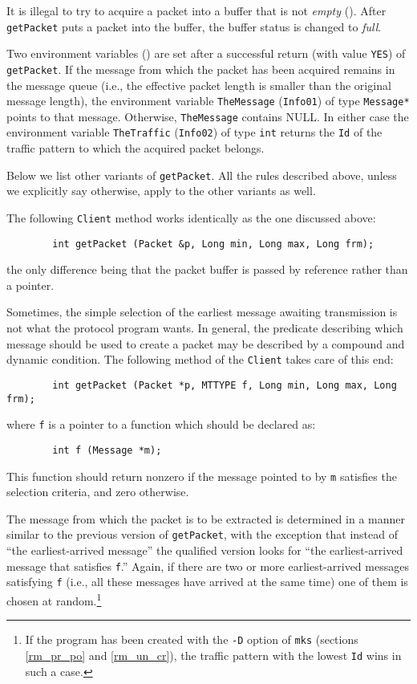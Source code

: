 It is illegal to try to acquire a packet into a buffer that is not
{\em empty\/} ().
After {\tt getPacket} puts a packet into the buffer, the buffer status
is changed to {\em full}.

Two environment variables () are set after a successful
return (with value {\tt YES}) of {\tt getPacket}.
If the message from which the packet has been acquired
remains in the message queue (i.e., the effective packet length is smaller than
the original message length), the environment variable
{\tt TheMessage} ({\tt Info01}) of type {\tt Message*} points to that message.
Otherwise, {\tt TheMessage} contains NULL.
In either case the environment variable
{\tt TheTraffic} ({\tt Info02}) of type {\tt int} returns the
{\tt Id} of the traffic pattern to which the acquired packet belongs.

Below we list other variants of {\tt getPacket}.
All the rules described above, unless we explicitly say otherwise,
apply to the other variants as well.

The following {\tt Client} method works identically as the one discussed
above:
\begin{verbatim}
        int getPacket (Packet &p, Long min, Long max, Long frm);
\end{verbatim}
the only difference being that the packet buffer is passed by reference
rather than a pointer.

Sometimes, the simple selection of the earliest message awaiting transmission
is not what the protocol program wants.
In general, the predicate describing which message should be used to create
a packet may be described by a compound and dynamic condition.
The following method of the {\tt Client} takes care of this end:
\begin{verbatim}
        int getPacket (Packet *p, MTTYPE f, Long min, Long max, Long frm);
\end{verbatim}
where {\tt f} is a pointer to a function which should be declared as:
\begin{verbatim}
        int f (Message *m);
\end{verbatim}
This function should return nonzero if the message pointed to by {\tt m}
satisfies the selection criteria, and zero otherwise.

The message from which the packet is to be extracted is determined
in a manner
similar to the previous version of {\tt getPacket}, with the
exception that instead of ``the earliest-arrived message'' the qualified
version looks
for ``the earliest-arrived message that satisfies {\tt f}.''
Again, if there are two or more earliest-arrived messages satisfying {\tt f}
(i.e., all these messages have
arrived at the same time) one of them is chosen
at random.\footnote{If the program has been created
with the {\tt -D} option of {\tt mks} (sections \ref{rm_pr_po}
and \ref{rm_un_cr}), the traffic pattern with the lowest {\tt Id} wins in
such a case.}

